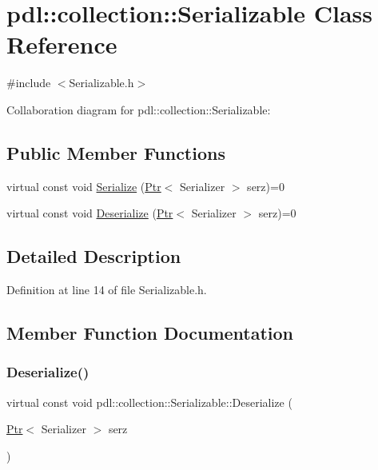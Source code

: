 \hypertarget{classpdl_1_1collection_1_1_serializable}{}\section{pdl\+::collection\+::Serializable Class Reference}
\label{classpdl_1_1collection_1_1_serializable}


{\ttfamily \#include $<$Serializable.\+h$>$}



Collaboration diagram for pdl\+::collection\+::Serializable\+:
\subsection*{Public Member Functions}
\begin{DoxyCompactItemize}
\item 
virtual const void \mbox{\hyperlink{classpdl_1_1collection_1_1_serializable_a2d3f87b827259bf1ab9bd7c9abde5e38}{Serialize}} (\mbox{\hyperlink{classpdl_1_1memory_1_1_ptr}{Ptr}}$<$ Serializer $>$ serz)=0
\item 
virtual const void \mbox{\hyperlink{classpdl_1_1collection_1_1_serializable_a81e769054dc20e17c6aa2c8c48644ca7}{Deserialize}} (\mbox{\hyperlink{classpdl_1_1memory_1_1_ptr}{Ptr}}$<$ Serializer $>$ serz)=0
\end{DoxyCompactItemize}


\subsection{Detailed Description}


Definition at line 14 of file Serializable.\+h.



\subsection{Member Function Documentation}
\mbox{\label{classpdl_1_1collection_1_1_serializable_a81e769054dc20e17c6aa2c8c48644ca7}} 
\subsubsection{\texorpdfstring{Deserialize()}{Deserialize()}}
{\footnotesize\ttfamily virtual const void pdl\+::collection\+::\+Serializable\+::\+Deserialize (\begin{DoxyParamCaption}\item[{\mbox{\hyperlink{classpdl_1_1memory_1_1_ptr}{Ptr}}$<$ Serializer $>$}]{serz }\end{DoxyParamCaption})\hspace{0.3cm}{\ttfamily [pure virtual]}}

